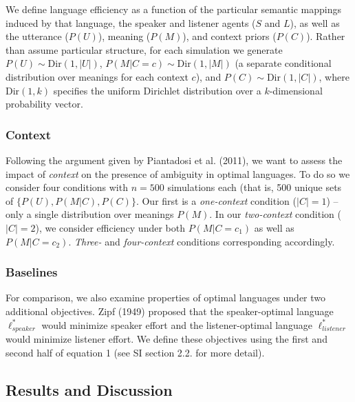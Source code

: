 \documentclass[10pt, letterpaper]{article}
\begin{document}
We define language efficiency as a function of the particular semantic
mappings induced by that language, the speaker and listener agents
(\(S\) and \(L\)), as well as the utterance (\(P(U)\)), meaning
(\(P(M)\)), and context priors (\(P(C)\)). Rather than assume particular
structure, for each simulation we generate
\(P(U) \sim \text{Dir}(1, |U|)\), \(P(M|C=c) \sim \text{Dir}(1, |M|)\)
(a separate conditional distribution over meanings for each context
\(c\)), and \(P(C) \sim \text{Dir}(1, |C|)\), where \(\text{Dir}(1, k)\)
specifies the uniform Dirichlet distribution over a \(k\)-dimensional
probability vector.\par

\subsubsection{Context}\label{context}

Following the argument given by Piantadosi et al. (2011), we want to
assess the impact of \emph{context} on the presence of ambiguity in
optimal languages. To do so we consider four conditions with \(n=500\)
simulations each (that is, 500 unique sets of
\(\{P(U), P(M|C), P(C)\}\). Our first is a \textit{one-context}
condition (\(|C|=1\)) -- only a single distribution over meanings
\(P(M)\). In our \textit{two-context} condition (\(|C| = 2\)), we
consider efficiency under both \(P(M|C=c_1)\) as well as \(P(M|C=c_2)\).
\textit{Three-} and \textit{four-context} conditions corresponding
accordingly.\par

\subsubsection{Baselines}\label{baselines}

For comparison, we also examine properties of optimal languages under
two additional objectives. Zipf (1949) proposed that the speaker-optimal
language \(\ell_{speaker}^*\) would minimize speaker effort and the
listener-optimal language \(\ell_{listener}^*\) would minimize listener
effort. We define these objectives using the first and second half of
equation 1 (see SI section 2.2. for more detail).\par

\subsection{Results and Discussion}\label{results-and-discussion}
\end{document}
